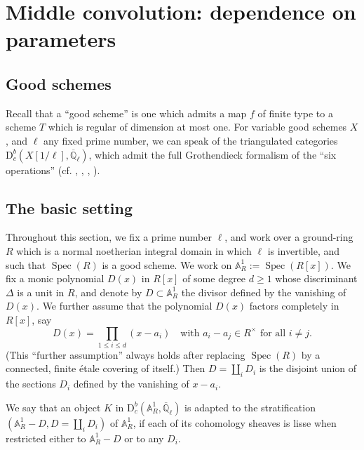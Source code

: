 \chapter{Middle convolution: dependence on parameters}
\label{chap:4}
\setcounter{section}{-1}

\section{Good schemes}\label{sec:4.0}

Recall that a ``good scheme'' is one which admits a map \(f\) of finite type to
a scheme \(T\) which is regular of dimension at most one. For variable good
schemes \(X\), and \(\ell\) any fixed prime number, we can speak of the
triangulated categories
\(\mathrm{D}^b_c(X[1/\ell],\overline{\mathbb{Q}}_\ell)\), which admit the full
Grothendieck formalism of the ``six operations''
(cf. \cite{De-ThFin}, \cite{De-WeilII}, \cite{Ek}, \cite{Me-SO}).

\section{The basic setting}\label{sec:4.1}

Throughout this section, we fix a prime number \(\ell\), and work over a
ground-ring \(R\) which is a normal noetherian integral domain in which \(\ell\)
is invertible, and such that \(\operatorname{Spec}(R)\) is a good scheme. We
work on
\(\mathbb{A}^1_R:=\operatorname{Spec}(R[x])\). We fix a monic polynomial
\(D(x)\) in \(R[x]\) of some degree \(d\geq1\) whose discriminant \(\Delta\) is
a unit in \(R\), and denote by \(D\subset\mathbb{A}^1_R\) the divisor defined
by the vanishing of \(D(x)\). We further assume that the polynomial \(D(x)\)
factors completely in \(R[x]\), say
\[
  D(x)=\prod_{1\leq i\leq d}(x-a_i)
  \quad\text{with }a_i-a_j\in R^\times\text{ for all }i\ne j.
\]
(This ``further assumption'' always holds after replacing
\(\operatorname{Spec}(R)\) by a connected, finite étale covering of itself.)
Then \(D=\coprod_i D_i\) is the disjoint union of the sections \(D_i\) defined
by the vanishing of \(x-a_i\).

We say that an object \(K\) in
\(\mathrm{D}^b_c(\mathbb{A}^1_R,\overline{\mathbb{Q}}_\ell)\) is adapted to
the stratification
\((\mathbb{A}^1_R-D,D=\coprod_iD_i)\) of \(\mathbb{A}^1_R\), if each of its
cohomology sheaves is lisse when restricted either to \(\mathbb{A}^1_R-D\) or
to any \(D_i\).

